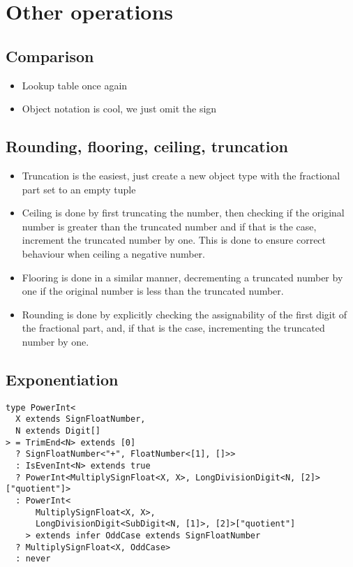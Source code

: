 \section{Other operations}

\subsection{Comparison} 

\begin{itemize}
  \item Lookup table once again
  \item Object notation is cool, we just omit the sign
\end{itemize}

\subsection{Rounding, flooring, ceiling, truncation}

\begin{itemize}
  \item Truncation is the easiest, just create a new  object type with the fractional part set to an empty tuple
  \item Ceiling is done by first truncating the number, then checking if the original number is greater than the truncated number and if that is the case, increment the truncated number by one. This is done to ensure correct behaviour when ceiling a negative number.
  \item Flooring is done in a similar manner, decrementing a truncated number by one if the original number is less than the truncated number.
  \item Rounding is done by explicitly checking the assignability of the first digit of the fractional part, and, if that is the case, incrementing the truncated number by one.
\end{itemize}

\subsection{Exponentiation}

\begin{listing}[ht]
\caption{}\label{lst:}
\begin{verbatim}
type PowerInt<
  X extends SignFloatNumber,
  N extends Digit[]
> = TrimEnd<N> extends [0]
  ? SignFloatNumber<"+", FloatNumber<[1], []>>
  : IsEvenInt<N> extends true
  ? PowerInt<MultiplySignFloat<X, X>, LongDivisionDigit<N, [2]>["quotient"]>
  : PowerInt<
      MultiplySignFloat<X, X>,
      LongDivisionDigit<SubDigit<N, [1]>, [2]>["quotient"]
    > extends infer OddCase extends SignFloatNumber
  ? MultiplySignFloat<X, OddCase>
  : never
\end{verbatim}
\end{listing}

